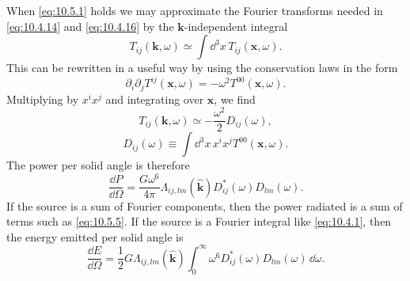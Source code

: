 When \eqref{eq:10.5.1} holds we may approximate the Fourier transforms
needed in \eqref{eq:10.4.14} and \eqref{eq:10.4.16} by the
\(\mathbf{k}\)-independent integral
\begin{equation}
  T_{ij}(\mathbf{k},\omega)
  \simeq
  \int \dd^3x\,T_{ij}(\mathbf{x},\omega).
  \tag{10.5.2}\label{eq:10.5.2}
\end{equation}
This can be rewritten in a useful way by using the conservation laws in the
form
\[
  \partial_i\partial_jT^{ij}(\mathbf{x},\omega)
  =
  -\omega^2T^{00}(\mathbf{x},\omega).
\]
Multiplying by \(x^ix^j\) and integrating over \(\mathbf{x}\), we find
\begin{equation}
  T_{ij}(\mathbf{k},\omega)
  \simeq
  -\frac{\omega^2}{2}D_{ij}(\omega),
  \tag{10.5.3}\label{eq:10.5.3}
\end{equation}
\begin{equation}
  D_{ij}(\omega)
  \equiv
  \int \dd^3x\,x^ix^jT^{00}(\mathbf{x},\omega).
  \tag{10.5.4}\label{eq:10.5.4}
\end{equation}
The power per solid angle is therefore
\begin{equation}
  \frac{\dd P}{\dd\Omega}
  =
  \frac{G\omega^6}{4\pi}
  \Lambda_{ij,lm}(\widehat{\mathbf{k}})
  D_{ij}^*(\omega)D_{lm}(\omega).
  \tag{10.5.5}\label{eq:10.5.5}
\end{equation}
If the source is a sum of Fourier components, then the power radiated is a
sum of terms such as \eqref{eq:10.5.5}. If the source is a Fourier integral
like \eqref{eq:10.4.1}, then the energy emitted per solid angle is
\begin{equation}
  \frac{\dd E}{\dd\Omega}
  =
  \frac12G\Lambda_{ij,lm}(\widehat{\mathbf{k}})
  \int_0^\infty
  \omega^6D_{ij}^*(\omega)D_{lm}(\omega)\,\dd\omega.
  \tag{10.5.6}\label{eq:10.5.6}
\end{equation}

